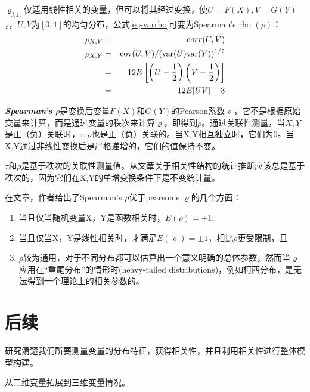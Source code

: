 \documentclass[UTF8]{ctexart}
\begin{document}
$\varrho_{j_1 j_2}$仅适用线性相关的变量，但可以将其经过变换，使$U=F(X),V=G(Y)$，\cite{Smith2009}，$U,V$为$[0,1]$的均匀分布，公式\ref{eq-varrho}可变为\textcolor[rgb]{1,0,0}{Spearman's rho $(\rho)$}：
\begin{eqnarray}
    \rho_{X,Y} &=& corr(U,V) \notag \\
    \rho_{X,Y} &=& \text{cov}(U,V)/(\text{var}(U)\text{var}(Y))^{1/2} \notag \\
    &=& 12E \left[ \left(U - \dfrac{1}{2}\right)\left(V - \dfrac{1}{2}\right) \right] \notag \\
    &=& 12E [UV] -3
    \label{eq-rhoSimplified}
\end{eqnarray}

\emph{\textbf{\textcolor[rgb]{1,0,0}{Spearman's $\rho$}}}是变换后变量$F(X)$和$G(Y)$的Pearson系数$\varrho$\cite{Montes2015}，它不是根据原始变量来计算，而是通过变量的秩次来计算$\varrho$，即得到$\rho$。通过关联性测量，当$X,Y$是正（负）关联时，$\tau,\rho$也是正（负）关联的。当X,Y相互独立时，它们为0。当X,Y通过非线性变换后是严格递增的，它们的值保持不变。

\textcolor[rgb]{1,0,0}{$\tau$和$\rho$是基于秩次的关联性测量值。从文章\cite{Genest2007}关于相关性结构的统计推断应该总是基于秩次的，因为它们在X,Y的单增变换条件下是不变统计量。}

在文章\cite{Genest2007}，作者给出了Spearman's $\rho$优于pearson's $\varrho$的几个方面：
\begin{enumerate}[1.]
    \item 当且仅当随机变量X，Y是函数相关时，$E(\rho) = \pm 1$;
    \item 当且仅当X，Y是线性相关时，才满足$E(\varrho) = \pm 1$，相比$\rho$更受限制，且
    \item $\rho$较为通用，对于不同分布都可以估算出一个意义明确的总体参数，然而当$\varrho$应用在``重尾分布''的情形时(heavy-tailed distributions)，例如柯西分布，是无法得到一个理论上的相关参数的。
\end{enumerate}

\section{后续}
研究清楚我们所要测量变量的分布特征，获得相关性，并且利用相关性进行整体模型构建。

从二维变量拓展到三维变量情况。


\end{document}
